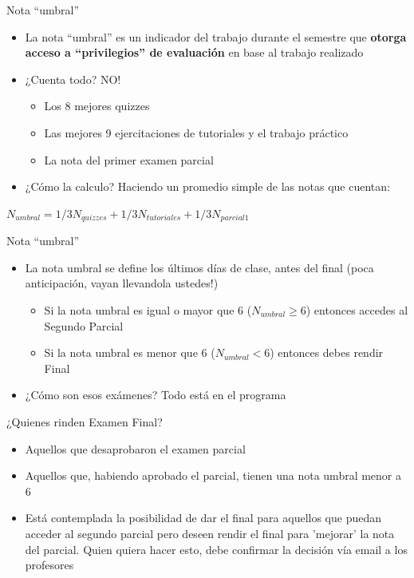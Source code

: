 \documentclass{beamer}
\begin{document}
\begin{frame}{Nota ``umbral''}
    \begin{itemize}
        \item La nota ``umbral'' es un indicador del trabajo durante el semestre que \textbf{otorga acceso a ``privilegios'' de evaluación} en base al trabajo realizado
        \item ¿Cuenta todo? NO!
        \begin{itemize}
            \item Los 8 mejores quizzes
            \item Las mejores 9 ejercitaciones de tutoriales y el trabajo práctico
            \item La nota del primer examen parcial
        \end{itemize}
        \item ¿Cómo la calculo? Haciendo un promedio simple de las notas que cuentan:
    \end{itemize}
        
    \begin{center}
    $N_{umbral}=1/3N_{quizzes}+1/3N_{tutoriales}+1/3N_{parcial 1}$   
    \end{center}
\end{frame}

\begin{frame}{Nota ``umbral''}
    \begin{itemize}
        \item La nota umbral se define los últimos días de clase, antes del final (poca anticipación, vayan llevandola ustedes!)      
        \begin{itemize}
            \item Si la nota umbral es igual o mayor que 6 ($N_{umbral} \geq 6$) entonces accedes al Segundo Parcial
            \item Si la nota umbral es menor que 6 ($N_{umbral} < 6$) entonces debes rendir Final
        \end{itemize}
        \item ¿Cómo son esos exámenes? Todo está en el programa 
    \end{itemize}
\end{frame}

\begin{frame}{¿Quienes rinden Examen Final?}
    \begin{itemize}
        \item Aquellos que desaprobaron el examen parcial
        \item Aquellos que, habiendo aprobado el parcial, tienen una nota umbral menor a 6
        \item Está contemplada la posibilidad de dar el final para aquellos que puedan acceder al segundo parcial pero deseen rendir el final para 'mejorar' la nota del parcial. Quien quiera hacer esto, debe confirmar la decisión vía email a los profesores
    \end{itemize}
\end{frame}
\end{document}
